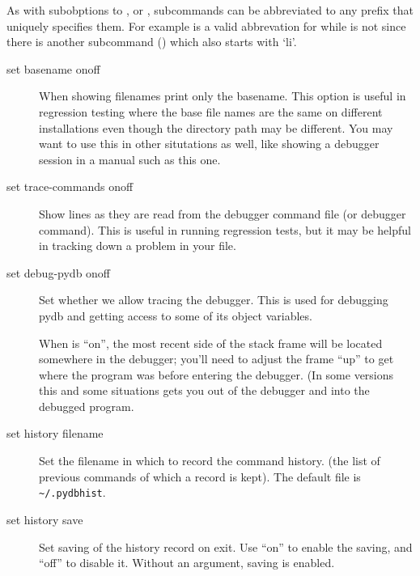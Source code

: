 As with subobptions to , or , 
subcommands can be abbreviated to any prefix that uniquely
specifies them. For example  is a valid abbrevation for
 while  is not since there is another
subcommand () which also starts with `li'.

\begin{description}

\item[set basename on\code{\Large{|}}off]\label{command:basename}

When showing filenames print only the basename. This option is useful
in regression testing where the base file names are the same
on different installations even though the directory path may
be different. You may want to use this in other
situtations as well, like showing a debugger session in a manual
such as this one. 

\item[set trace-commands on\code{\Large{|}}off]\label{command:trace-commands}
 
Show lines as they are read from the debugger command file (or
 debugger command). This is useful in running
regression tests, but it may be helpful in tracking down a problem in
your  file.

\item[set debug-pydb on\code{\Large{|}}off]\label{command:debug-pydb}

Set whether we allow tracing the debugger. This is used for debugging
pydb and getting access to some of its object variables. 

When  is ``on'', the most recent side of the stack
frame will be located somewhere in the debugger; you'll need to adjust
the frame ``up'' to get where the program was before entering the
debugger. (In some versions this and some situations 
gets you out of the debugger and into the debugged program.

\item[set history filename ]\label{command:hist-filename}

Set the filename in which to record the command history.
(the list of previous commands of which a record is kept). The default
file is \verb|~/.pydbhist|.

\item[set history save]

Set saving of the history record on exit.  Use ``on'' to enable the
saving, and ``off'' to disable it.  Without an argument, saving is
enabled.


\end{description}
